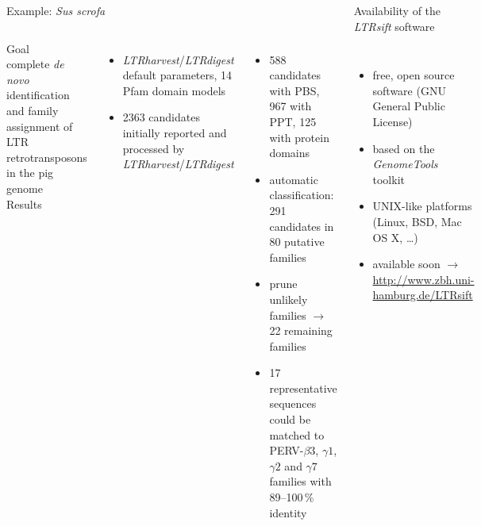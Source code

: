 \documentclass[final]{beamer}
\begin{document}
\begin{frame}[fragile]
\begin{columns}[t]
     \vspace{-4cm}
     \begin{block}{Example: \emph{Sus scrofa}}
        \begin{columns}
            \alert{Goal}\\
            complete \emph{de novo} identification and family assignment
            of LTR retrotransposons in the pig genome\\[3mm]
            \alert{Results}
            \begin{itemize}
              \item \emph{LTRharvest}/\emph{LTRdigest} default
                    parameters, 14 Pfam domain models
              \item 2363 candidates initially reported and processed by
                    \emph{LTRharvest}/\emph{LTRdigest}
            \end{itemize}
            \begin{itemize}
              \item 588 candidates with PBS, 967 with PPT, 125 with
                    protein domains
              \item automatic classification:\\291
                    candidates in 80 putative families
              \item prune unlikely families $\to$ 22 remaining families
              \item 17 representative sequences could be matched to
                    PERV-$\beta 3$, $\gamma 1$, $\gamma 2$ and $\gamma 7$
                    families with 89--100\,\% identity
            \end{itemize}
            \vspace{-1.5mm}
        \end{columns}
      \end{block}

      \begin{block}{Availability of the \emph{LTRsift} software}
        \begin{columns}
            \begin{itemize}
              \item free, open source software (GNU General Public License)
              \item based on the \emph{GenomeTools} toolkit~\cite{GRE:STEI:KUR:2012B}
              \item UNIX-like platforms (Linux, BSD, Mac OS X, \dots)
              \item available soon $\to$ \url{http://www.zbh.uni-hamburg.de/LTRsift}
            \end{itemize}
        \end{columns}
      \end{block}


\end{columns}
\end{frame}
\end{document}
